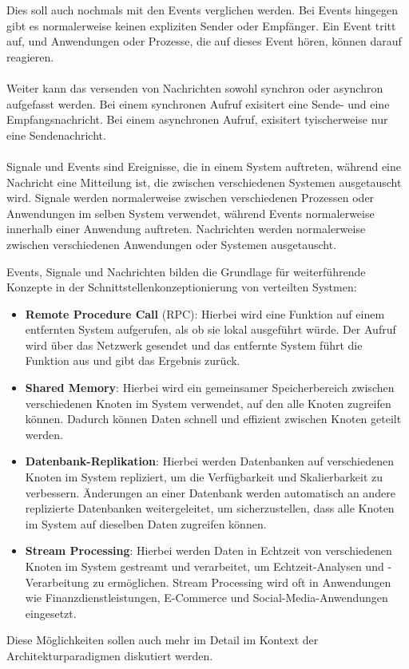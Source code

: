 Dies soll auch nochmals mit den Events verglichen werden. Bei Events hingegen gibt es normalerweise keinen expliziten Sender oder Empfänger. Ein Event tritt auf, und Anwendungen oder Prozesse, die auf dieses Event hören, können darauf reagieren. 
\\\\
Weiter kann das versenden von Nachrichten sowohl synchron oder asynchron aufgefasst werden. Bei einem synchronen Aufruf exisitert eine Sende- und eine Empfangsnachricht. Bei einem asynchronen Aufruf, exisitert tyischerweise nur eine Sendenachricht.
\\\\
Signale und Events sind Ereignisse, die in einem System auftreten, während eine Nachricht eine Mitteilung ist, die zwischen verschiedenen Systemen ausgetauscht wird. Signale werden normalerweise zwischen verschiedenen Prozessen oder Anwendungen im selben System verwendet, während Events normalerweise innerhalb einer Anwendung auftreten. Nachrichten werden normalerweise zwischen verschiedenen Anwendungen oder Systemen ausgetauscht.

Events, Signale und Nachrichten bilden die Grundlage für weiterführende Konzepte in der Schnittstellenkonzeptionierung von verteilten Systmen:
\begin{itemize}  
\item \textbf{Remote Procedure Call} (RPC): Hierbei wird eine Funktion auf einem entfernten System aufgerufen, als ob sie lokal ausgeführt würde. Der Aufruf wird über das Netzwerk gesendet und das entfernte System führt die Funktion aus und gibt das Ergebnis zurück.
\item \textbf{Shared Memory}: Hierbei wird ein gemeinsamer Speicherbereich zwischen verschiedenen Knoten im System verwendet, auf den alle Knoten zugreifen können. Dadurch können Daten schnell und effizient zwischen Knoten geteilt werden.
\item \textbf{Datenbank-Replikation}: Hierbei werden Datenbanken auf verschiedenen Knoten im System repliziert, um die Verfügbarkeit und Skalierbarkeit zu verbessern. Änderungen an einer Datenbank werden automatisch an andere replizierte Datenbanken weitergeleitet, um sicherzustellen, dass alle Knoten im System auf dieselben Daten zugreifen können.
\item \textbf{Stream Processing}: Hierbei werden Daten in Echtzeit von verschiedenen Knoten im System gestreamt und verarbeitet, um Echtzeit-Analysen und -Verarbeitung zu ermöglichen. Stream Processing wird oft in Anwendungen wie Finanzdienstleistungen, E-Commerce und Social-Media-Anwendungen eingesetzt.
\end{itemize}  
Diese Möglichkeiten sollen auch mehr im Detail im Kontext der Architekturparadigmen diskutiert werden.


